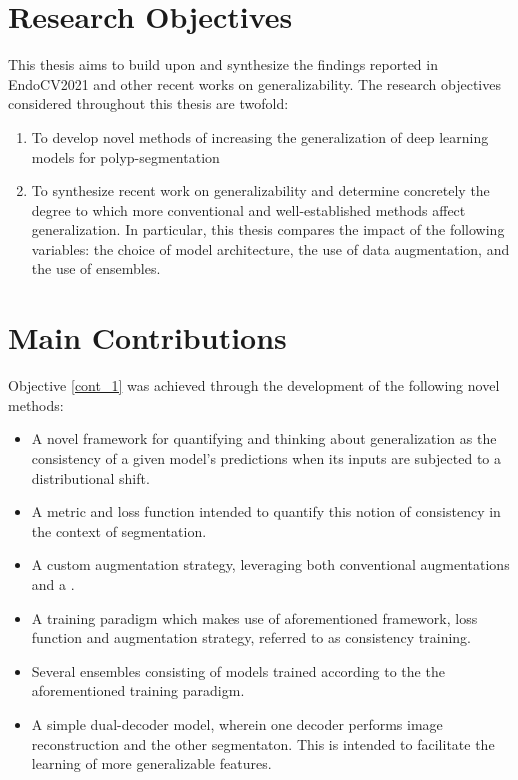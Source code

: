     \section{Research Objectives}
    This thesis aims to build upon and synthesize the findings reported in EndoCV2021 and other recent works on generalizability. The research objectives considered throughout this thesis are twofold:
    \begin{enumerate}
        \item To develop novel methods of increasing the generalization of deep learning models for polyp-segmentation \label{cont_1}
        \item To synthesize recent work on generalizability and determine concretely the degree to which more conventional and well-established methods affect generalization. In particular, this thesis compares the impact of the following variables: the choice of model architecture, the use of data augmentation, and the use of ensembles. \label{cont_2}
    \end{enumerate}
   
    \section{Main Contributions}
    Objective \ref{cont_1} was achieved through the development of the following novel methods:
    \begin{itemize}
        \item A novel framework for quantifying and thinking about generalization as the consistency of a given model's predictions when its inputs are subjected to a distributional shift.
        \item A metric and loss function intended to quantify this notion of consistency in the context of segmentation.
        \item A custom augmentation strategy, leveraging both conventional augmentations and a .
        \item A training paradigm which makes use of aforementioned framework, loss function and augmentation strategy, referred to as consistency training.
        \item Several ensembles consisting of models trained according to the the aforementioned training paradigm.
        \item A simple dual-decoder model, wherein one decoder performs image reconstruction and the other segmentaton. This is intended to facilitate the learning of more generalizable features.
    \end{itemize}
    
